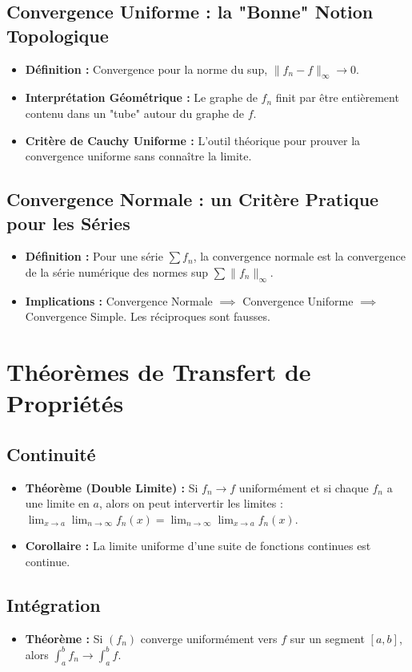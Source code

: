 \documentclass[12pt, a4paper, parskip=full]{report}
\theoremstyle{agregstyle}
\begin{document}
\subsection{Convergence Uniforme : la "Bonne" Notion Topologique}
\begin{itemize}
    \item \textbf{Définition :} Convergence pour la norme du sup, $\|f_n - f\|_\infty \to 0$.
    \item \textbf{Interprétation Géométrique :} Le graphe de $f_n$ finit par être entièrement contenu dans un "tube" autour du graphe de $f$.
    \item \textbf{Critère de Cauchy Uniforme :} L'outil théorique pour prouver la convergence uniforme sans connaître la limite.
\end{itemize}
\subsection{Convergence Normale : un Critère Pratique pour les Séries}
\begin{itemize}
    \item \textbf{Définition :} Pour une série $\sum f_n$, la convergence normale est la convergence de la série numérique des normes sup $\sum \|f_n\|_\infty$.
    \item \textbf{Implications :} Convergence Normale $\implies$ Convergence Uniforme $\implies$ Convergence Simple. Les réciproques sont fausses.
\end{itemize}

\section{Théorèmes de Transfert de Propriétés}
\subsection{Continuité}
\begin{itemize}
    \item \textbf{Théorème (Double Limite) :} Si $f_n \to f$ uniformément et si chaque $f_n$ a une limite en $a$, alors on peut intervertir les limites : $\lim_{x \to a} \lim_{n \to \infty} f_n(x) = \lim_{n \to \infty} \lim_{x \to a} f_n(x)$.
    \item \textbf{Corollaire :} La limite uniforme d'une suite de fonctions continues est continue.
\end{itemize}
\subsection{Intégration}
\begin{itemize}
    \item \textbf{Théorème :} Si $(f_n)$ converge uniformément vers $f$ sur un segment $[a,b]$, alors $\int_a^b f_n \to \int_a^b f$.
\end{itemize}
\end{document}

